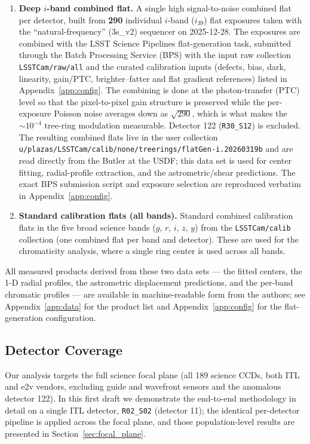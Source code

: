 \begin{enumerate}
\item \textbf{Deep $i$-band combined flat.} A single high signal-to-noise combined flat per
detector, built from \textbf{290} individual $i$-band ($i_{39}$) flat exposures taken with
the ``natural-frequency'' (3s\_v2) sequencer on 2025-12-28. The exposures are combined with
the LSST Science Pipelines flat-generation task, submitted through the Batch Processing
Service (BPS) with the input raw collection \texttt{LSSTCam/raw/all} and the curated
calibration inputs (defects, bias, dark, linearity, gain/PTC, brighter--fatter and flat
gradient references) listed in Appendix~\ref{app:config}. The combining is done at the
photon-transfer (PTC) level so that the pixel-to-pixel gain structure is preserved while the
per-exposure Poisson noise averages down as $\sqrt{290}$, which is what makes the
$\sim10^{-4}$ tree-ring modulation measurable. Detector 122 (\texttt{R30\_S12}) is excluded.
The resulting combined flats live in the user collection
\texttt{u/plazas/LSSTCam/calib/none/treerings/flatGen-i.20260319b} and are read directly from
the Butler at the USDF; this data set is used for center fitting, radial-profile extraction,
and the astrometric/shear predictions. The exact BPS submission script and exposure selection
are reproduced verbatim in Appendix~\ref{app:config}.

\item \textbf{Standard calibration flats (all bands).} Standard \lsstcam{} combined
calibration flats in the five broad science bands ($g$, $r$, $i$, $z$, $y$) from the
\texttt{LSSTCam/calib} collection (one combined flat per band and detector). These are used
for the chromaticity analysis, where a single ring center is used across all bands.
\end{enumerate}

All measured products derived from these two data sets --- the fitted centers, the 1-D radial
profiles, the astrometric displacement predictions, and the per-band chromatic profiles ---
are available in machine-readable form from the authors; see Appendix~\ref{app:data} for the
product list and Appendix~\ref{app:config} for the flat-generation configuration.

\subsection{Detector Coverage}

Our analysis targets the full \lsstcam{} science focal plane (all 189 science CCDs, both ITL
and e2v vendors, excluding guide and wavefront sensors and the anomalous detector 122). In
this first draft we demonstrate the end-to-end methodology in detail on a single ITL detector,
\texttt{R02\_S02} (detector 11); the identical per-detector pipeline is applied across the
focal plane, and those population-level results are presented in
Section~\ref{sec:focal_plane}.

